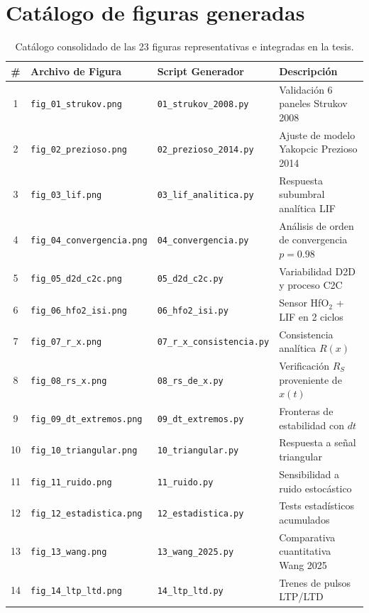 \section{Catálogo de figuras generadas}
\label{sec:catalogo_figuras}

\begin{table}[H]
\centering
\caption{Catálogo consolidado de las 23 figuras representativas e integradas en la tesis.}
\label{tab:catalogo_figuras}
\begin{tabular}{c l l p{5.5cm}}
\toprule
\# & Archivo de Figura & Script Generador & Descripción \\
\midrule
1 & \texttt{fig\_01\_strukov.png} & \texttt{01\_strukov\_2008.py} & Validación 6 paneles Strukov 2008 \\
2 & \texttt{fig\_02\_prezioso.png} & \texttt{02\_prezioso\_2014.py} & Ajuste de modelo Yakopcic Prezioso 2014 \\
3 & \texttt{fig\_03\_lif.png} & \texttt{03\_lif\_analitica.py} & Respuesta subumbral analítica LIF \\
4 & \texttt{fig\_04\_convergencia.png} & \texttt{04\_convergencia.py} & Análisis de orden de convergencia $p=0.98$ \\
5 & \texttt{fig\_05\_d2d\_c2c.png} & \texttt{05\_d2d\_c2c.py} & Variabilidad D2D y proceso C2C \\
6 & \texttt{fig\_06\_hfo2\_isi.png} & \texttt{06\_hfo2\_isi.py} & Sensor HfO$_2$ + LIF en 2 ciclos \\
7 & \texttt{fig\_07\_r\_x.png} & \texttt{07\_r\_x\_consistencia.py} & Consistencia analítica $R(x)$ \\
8 & \texttt{fig\_08\_rs\_x.png} & \texttt{08\_rs\_de\_x.py} & Verificación $R_S$ proveniente de $x(t)$ \\
9 & \texttt{fig\_09\_dt\_extremos.png} & \texttt{09\_dt\_extremos.py} & Fronteras de estabilidad con $dt$ \\
10 & \texttt{fig\_10\_triangular.png} & \texttt{10\_triangular.py} & Respuesta a señal triangular \\
11 & \texttt{fig\_11\_ruido.png} & \texttt{11\_ruido.py} & Sensibilidad a ruido estocástico \\
12 & \texttt{fig\_12\_estadistica.png} & \texttt{12\_estadistica.py} & Tests estadísticos acumulados \\
13 & \texttt{fig\_13\_wang.png} & \texttt{13\_wang\_2025.py} & Comparativa cuantitativa Wang 2025 \\
14 & \texttt{fig\_14\_ltp\_ltd.png} & \texttt{14\_ltp\_ltd.py} & Trenes de pulsos LTP/LTD \\

\end{tabular}
\end{table}
